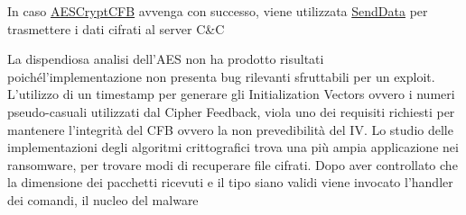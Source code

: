 \documentclass[12pt,oneside]{fithesis2}
\begin{document}
        In caso \url{AESCryptCFB} avvenga con successo, viene utilizzata \url{SendData} per trasmettere i dati cifrati al server C\&C
        \begin{center}
        \end{center}
        La dispendiosa analisi dell'AES non ha prodotto risultati poiché\newline l'implementazione non presenta bug rilevanti sfruttabili per un exploit. L'utilizzo di un timestamp per generare gli Initialization Vectors ovvero i numeri pseudo-casuali utilizzati dal Cipher Feedback, viola uno dei requisiti richiesti per mantenere l'integrità del CFB ovvero la non prevedibilità del IV. Lo studio delle implementazioni degli algoritmi crittografici trova una più ampia applicazione nei ransomware, per trovare modi di recuperare file cifrati.   
        \clearpage
        Dopo aver controllato che la dimensione dei pacchetti ricevuti e il tipo siano validi viene invocato l'handler dei comandi, il nucleo del malware
        
\end{document}
